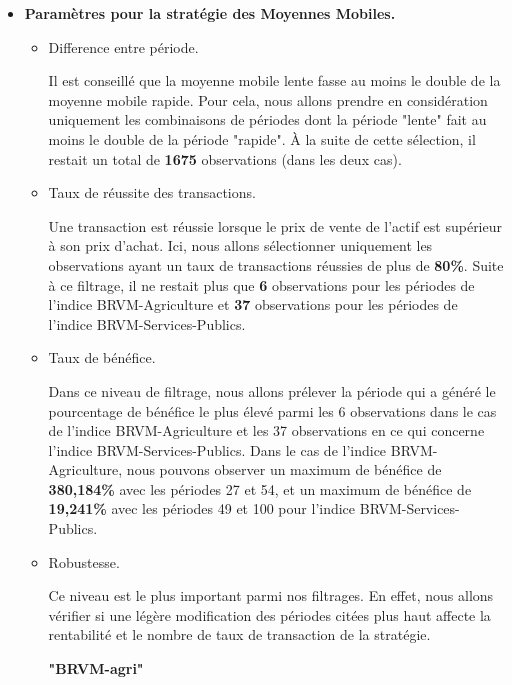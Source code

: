 \begin{itemize}
\item
  \textbf{Paramètres pour la stratégie des Moyennes Mobiles.}

  \begin{itemize}
  \item
    Difference entre période.

    {Il est conseillé que la moyenne mobile lente fasse au moins le
    double de la moyenne mobile rapide. Pour cela, nous allons prendre
    en considération uniquement les combinaisons de périodes dont la
    période "lente" fait au moins le double de la période "rapide". À la
    suite de cette sélection, il restait un total de \textbf{1675}
    observations (dans les deux cas). }
  \item
    Taux de réussite des transactions.

    {Une transaction est réussie lorsque le prix de vente de l'actif est
    supérieur à son prix d'achat. Ici, nous allons sélectionner
    uniquement les observations ayant un taux de transactions réussies
    de plus de \textbf{80\%}. Suite à ce filtrage, il ne restait plus
    que \textbf{6} observations pour les périodes de l'indice
    BRVM-Agriculture et \textbf{37} observations pour les périodes de
    l'indice BRVM-Services-Publics.}
  \item
    Taux de bénéfice.

    {Dans ce niveau de filtrage, nous allons prélever la période qui a
    généré le pourcentage de bénéfice le plus élevé parmi les 6
    observations dans le cas de l'indice BRVM-Agriculture et les 37
    observations en ce qui concerne l'indice BRVM-Services-Publics. Dans
    le cas de l'indice BRVM-Agriculture, nous pouvons observer un
    maximum de bénéfice de \textbf{380,184\%} avec les périodes 27 et
    54, et un maximum de bénéfice de \textbf{19,241\%} avec les périodes
    49 et 100 pour l'indice BRVM-Services-Publics.}
  \item
    Robustesse.

    {Ce niveau est le plus important parmi nos filtrages. En effet, nous
    allons vérifier si une légère modification des périodes citées plus
    haut affecte la rentabilité et le nombre de taux de transaction de
    la stratégie.}

    \textbf{"BRVM-agri"}


\end{itemize}
\end{itemize}
